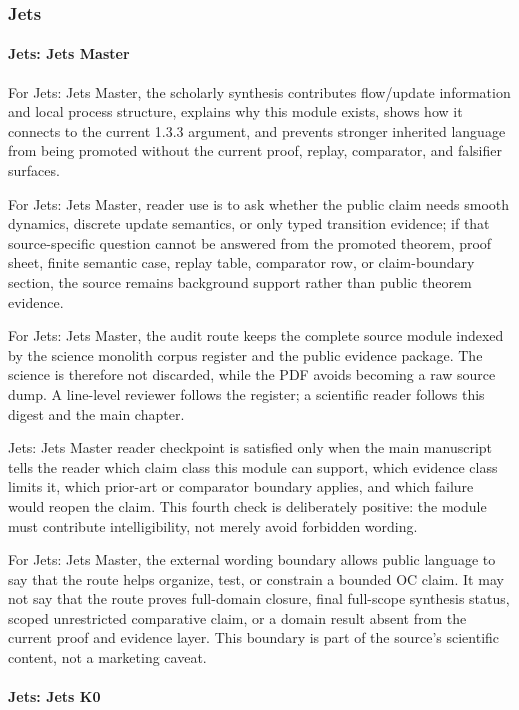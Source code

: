 \subsubsection{Jets}

\paragraph{Jets: Jets Master}

For Jets: Jets Master, the scholarly synthesis contributes flow/update information and local process structure, explains why this module exists, shows how it connects to the current 1.3.3 argument, and prevents stronger inherited language from being promoted without the current proof, replay, comparator, and falsifier surfaces.


For Jets: Jets Master, reader use is to ask whether the public claim needs smooth dynamics, discrete update semantics, or only typed transition evidence; if that source-specific question cannot be answered from the promoted theorem, proof sheet, finite semantic case, replay table, comparator row, or claim-boundary section, the source remains background support rather than public theorem evidence.


For Jets: Jets Master, the audit route keeps the complete source module indexed by the science monolith corpus register and the public evidence package. The science is therefore not discarded, while the PDF avoids becoming a raw source dump. A line-level reviewer follows the register; a scientific reader follows this digest and the main chapter.


Jets: Jets Master reader checkpoint is satisfied only when the main manuscript tells the reader which claim class this module can support, which evidence class limits it, which prior-art or comparator boundary applies, and which failure would reopen the claim. This fourth check is deliberately positive: the module must contribute intelligibility, not merely avoid forbidden wording.


For Jets: Jets Master, the external wording boundary allows public language to say that the route helps organize, test, or constrain a bounded OC claim. It may not say that the route proves full-domain closure, final full-scope synthesis status, scoped unrestricted comparative claim, or a domain result absent from the current proof and evidence layer. This boundary is part of the source's scientific content, not a marketing caveat.


\paragraph{Jets: Jets K0}


